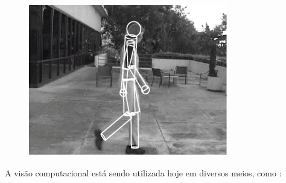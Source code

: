\begin{figure}[htb]
\begin{minipage}{0.48\textwidth}
    \includegraphics[width=.95\textwidth]{figuras/f2c2.png}
  \end{minipage}
\end{figure}




A visão computacional está sendo utilizada hoje em diversos meios, como \cite{caap}:


